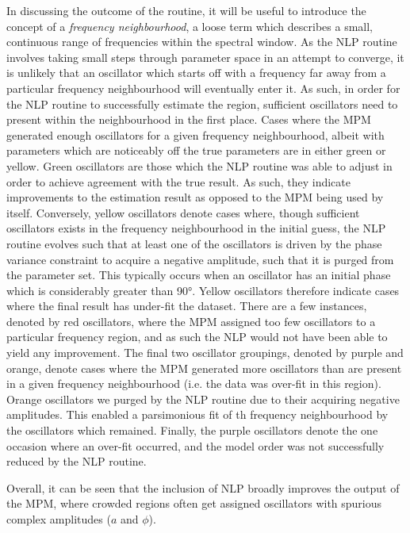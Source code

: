 In discussing the outcome of the routine, it will be useful to introduce the
concept of a \emph{frequency neighbourhood}, a loose term which describes a
small, continuous range of frequencies within the spectral window. As the
\ac{NLP} routine involves taking small steps
through parameter space in an attempt to converge, it is unlikely that an
oscillator which starts off with a frequency far away from a particular
frequency neighbourhood will eventually enter it.  As such, in order for the
\ac{NLP} routine to successfully estimate the region, sufficient oscillators
need to present within the neighbourhood in the first place. Cases where the
\ac{MPM} generated enough oscillators for a given frequency neighbourhood,
albeit with parameters which are noticeably off the true parameters are in
either green or yellow. Green oscillators are those which the \ac{NLP} routine
was able to adjust in order to achieve agreement with the true result. As such,
they indicate improvements to the estimation result as opposed to the \ac{MPM}
being used by itself. Conversely, yellow oscillators denote cases where, though
sufficient oscillators exists in the frequency neighbourhood in the initial
guess, the \ac{NLP} routine evolves such that at least one of the oscillators
is driven by the phase variance constraint to acquire a negative amplitude,
such that it is purged from the parameter set. This typically occurs when an
oscillator has an initial phase which is considerably greater than \ang{90}.
Yellow oscillators therefore indicate cases where the final result has
under-fit the dataset. There are a few instances, denoted by red oscillators,
where the \ac{MPM} assigned too few oscillators to a particular frequency
region, and as such the \ac{NLP} would not have been able to yield any
improvement.
The final two oscillator groupings, denoted by purple and orange, denote cases
where the \ac{MPM} generated more oscillators than are present in a given
frequency neighbourhood (i.e. the data was over-fit in this region). Orange
oscillators we purged by the \ac{NLP} routine due to their acquiring negative
amplitudes. This enabled a parsimonious fit of th frequency neighbourhood by
the oscillators which remained. Finally, the purple oscillators denote the one
occasion where an over-fit occurred, and the model order was not successfully
reduced by the \ac{NLP} routine.

Overall, it can be seen that the inclusion of \ac{NLP} broadly improves the
output of the \ac{MPM}, where crowded regions often get assigned oscillators
with spurious complex amplitudes ($a$ and  $\phi$). 

